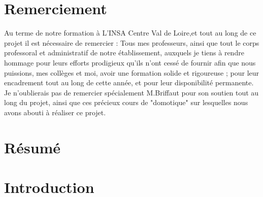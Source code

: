 \newpage
\section*{Remerciement}
Au terme de notre formation à L’INSA Centre Val de Loire,et tout au long de ce projet il est nécessaire de remercier :\newline
Tous mes professeurs, ainsi que tout le corps professoral et administratif de notre établissement, auxquels je tiens à rendre hommage pour leurs efforts prodigieux qu’ils n’ont cessé de fournir afin que nous puissions, mes collèges et moi, avoir une formation solide et rigoureuse ; pour leur encadrement tout au long de cette année, et pour leur disponibilité permanente. Je n’oublierais pas de remercier spécialement M.Briffaut pour son soutien tout au long du projet, ainsi que ces précieux cours de "domotique" sur lesquelles nous avons abouti à réaliser ce projet.\newline
\clearpage
\section*{Résumé}

\newpage
\tableofcontents
\clearpage

%
% 
%
%
%
%


\section{Introduction}


